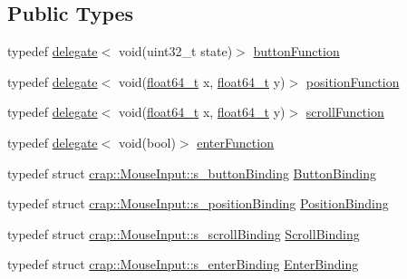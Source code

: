 \subsection*{Public Types}
\begin{DoxyCompactItemize}
\item 
typedef \hyperlink{classcrap_1_1delegate}{delegate}$<$ void(uint32\+\_\+t state)$>$ \hyperlink{classcrap_1_1_mouse_input_ae29f008887cdeda02cb0a8bbac759f52}{button\+Function}
\item 
typedef \hyperlink{classcrap_1_1delegate}{delegate}$<$ void(\hyperlink{crap__types_8h_ac55f3ae81b5bc9053760baacf57e47f4}{float64\+\_\+t} x, \hyperlink{crap__types_8h_ac55f3ae81b5bc9053760baacf57e47f4}{float64\+\_\+t} y)$>$ \hyperlink{classcrap_1_1_mouse_input_aa2d296ac0bf7bf9f29c13377534bf919}{position\+Function}
\item 
typedef \hyperlink{classcrap_1_1delegate}{delegate}$<$ void(\hyperlink{crap__types_8h_ac55f3ae81b5bc9053760baacf57e47f4}{float64\+\_\+t} x, \hyperlink{crap__types_8h_ac55f3ae81b5bc9053760baacf57e47f4}{float64\+\_\+t} y)$>$ \hyperlink{classcrap_1_1_mouse_input_a76d83afa5ade8d873bc0866b37e36f37}{scroll\+Function}
\item 
typedef \hyperlink{classcrap_1_1delegate}{delegate}$<$ void(bool)$>$ \hyperlink{classcrap_1_1_mouse_input_a1fb324bddbf07f2a44cb0f98c7bc11e4}{enter\+Function}
\item 
typedef struct \hyperlink{structcrap_1_1_mouse_input_1_1s__button_binding}{crap\+::\+Mouse\+Input\+::s\+\_\+button\+Binding} \hyperlink{classcrap_1_1_mouse_input_a4aef04436121adc836ded20bfe36d967}{Button\+Binding}
\item 
typedef struct \hyperlink{structcrap_1_1_mouse_input_1_1s__position_binding}{crap\+::\+Mouse\+Input\+::s\+\_\+position\+Binding} \hyperlink{classcrap_1_1_mouse_input_a104e87f3c70805567977acc81cc15f38}{Position\+Binding}
\item 
typedef struct \hyperlink{structcrap_1_1_mouse_input_1_1s__scroll_binding}{crap\+::\+Mouse\+Input\+::s\+\_\+scroll\+Binding} \hyperlink{classcrap_1_1_mouse_input_aa5c6a3bcfba809e9784dbd3aa3c46b65}{Scroll\+Binding}
\item 
typedef struct \hyperlink{structcrap_1_1_mouse_input_1_1s__enter_binding}{crap\+::\+Mouse\+Input\+::s\+\_\+enter\+Binding} \hyperlink{classcrap_1_1_mouse_input_a3616aed9af2333779cc502d22764f540}{Enter\+Binding}
\end{DoxyCompactItemize}
